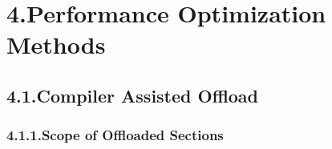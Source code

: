 \documentclass{article}
\begin{document}
\section{4.\hspace*{0.5em}Performance Optimization Methods}\label{sec-performance-optimization-methods}%

\subsection{4.1.\hspace*{0.5em}Compiler Assisted Offload}\label{sec-compiler-assisted-offload}%

\subsubsection{4.1.1.\hspace*{0.5em}Scope of Offloaded Sections}\label{sec-scope-of-offloaded-sections}%
\end{document}
